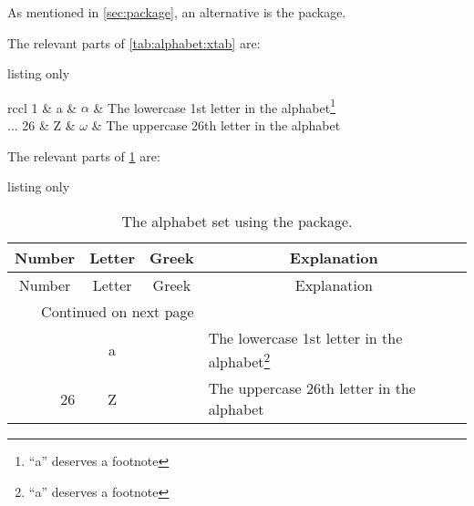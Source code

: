 As mentioned in \cref{sec:package}, an alternative
is the  package.

\clearpage
The relevant parts of \cref{tab:alphabet:xtab} are:
\begin{tcblisting}{listing only}
\tablelasttail{\bottomrule}
%
\label{tab:alphabet:xtab}
\begin{center}
  \begin{mpxtabular}{rccl}
   1 & a & \(\alpha\)   & The lowercase 1st letter in the alphabet\footnote{%
    \enquote{a} deserves a footnote}\\
    ...
    26 & Z & \(\omega\) & The uppercase 26th letter in the alphabet\\
  \end{mpxtabular}
\end{center}
\end{tcblisting}

\clearpage
The relevant parts of \cref{tab:alphabet:longtable} are:
\begin{tcblisting}{listing only}
\begin{longtable}{rccl}
  \caption{The alphabet set using the  package.%
  \label{tab:alphabet:longtable}}\\
  \toprule
  \multicolumn{1}{c}{Number} &
  \multicolumn{1}{c}{Letter} &
  \multicolumn{1}{c}{Greek} &
  \multicolumn{1}{c}{Explanation}\\
  \midrule
\endfirsthead
  \midrule
  \multicolumn{1}{c}{Number} &
  \multicolumn{1}{c}{Letter} &
  \multicolumn{1}{c}{Greek} &
  \multicolumn{1}{c}{Explanation}\\
  \midrule
\endhead
  \midrule
  \multicolumn{3}{r}{Continued on next page}\\
  \midrule
\endfoot
  \bottomrule
\endlastfoot
    1 & a & & The lowercase 1st letter in the alphabet\footnote{%
    \enquote{a} deserves a footnote}\\
    26 & Z & & The uppercase 26th letter in the alphabet\\
\end{longtable}
\end{tcblisting}

